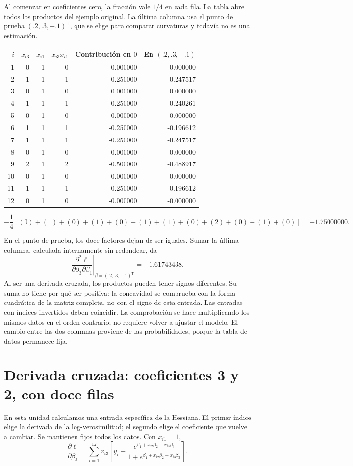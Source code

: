 \documentclass[11pt,a4paper]{article}
\newcommand{\T}{^{\mathsf T}}
\begin{document}
Al comenzar en coeficientes cero, la fracción vale $1/4$ en cada fila.
La tabla abre todos los productos del ejemplo original. La última
columna usa el punto de prueba $(.2,.3,-.1)^\mathsf T$, que se elige
para comparar curvaturas y todavía no es una estimación.
\begin{center}\small
\begin{tabular}{rrrrrr}
\toprule
$i$&$x_{i3}$&$x_{i1}$&$x_{i3}x_{i1}$&Contribución en $0$&En $(.2,.3,-.1)$\\\midrule1&0&1&0&-0.000000&-0.000000\\
2&1&1&1&-0.250000&-0.247517\\
3&0&1&0&-0.000000&-0.000000\\
4&1&1&1&-0.250000&-0.240261\\
5&0&1&0&-0.000000&-0.000000\\
6&1&1&1&-0.250000&-0.196612\\
7&1&1&1&-0.250000&-0.247517\\
8&0&1&0&-0.000000&-0.000000\\
9&2&1&2&-0.500000&-0.488917\\
10&0&1&0&-0.000000&-0.000000\\
11&1&1&1&-0.250000&-0.196612\\
12&0&1&0&-0.000000&-0.000000\\\bottomrule\end{tabular}\end{center}\[
-\frac14\left[(0)+(1)+(0)+(1)+(0)+(1)+(1)+(0)+(2)+(0)+(1)+(0)\right]=-1.75000000.
\]

En el punto de prueba, los doce factores dejan de ser iguales.
Sumar la última columna, calculada internamente sin redondear, da
\[
\left.\frac{\partial^2\ell}{\partial\beta_3\partial\beta_1}\right|_{\beta=(.2,.3,-.1)\T}=-1.61743438.
\]
Al ser una derivada cruzada, los productos pueden tener signos diferentes. Su suma no tiene por qué ser positiva: la concavidad se comprueba con la forma cuadrática de la matriz completa, no con el signo de esta entrada.
Las entradas con índices invertidos deben coincidir.
La comprobación se hace multiplicando los mismos datos en el orden
contrario; no requiere volver a ajustar el modelo.
El cambio entre las dos columnas proviene de las probabilidades,
porque la tabla de datos permanece fija.

\clearpage
\section{Derivada cruzada: coeficientes 3 y 2, con doce filas}\label{logit26}
En esta unidad calculamos una entrada específica de la Hessiana.
El primer índice elige la derivada de la log-verosimilitud; el segundo
elige el coeficiente que vuelve a cambiar.
Se mantienen fijos todos los datos. Con $x_{i1}=1$,
\[
\frac{\partial\ell}{\partial\beta_3}=\sum_{i=1}^{12}x_{i3}\left[y_i-\frac{e^{\beta_1+x_{i2}\beta_2+x_{i3}\beta_3}}{1+e^{\beta_1+x_{i2}\beta_2+x_{i3}\beta_3}}\right].
\]
\end{document}
